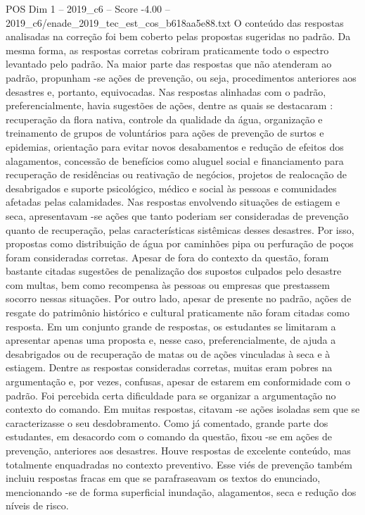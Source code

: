 \begin{textsample}{POS Dim 1 – 2019\_c6 – Score -4.00 – 2019\_c6/enade\_2019\_tec\_est\_cos\_b618aa5e88.txt}
O conteúdo das respostas analisadas na correção foi bem coberto pelas propostas sugeridas no padrão.
Da mesma forma, as respostas corretas cobriram praticamente todo o espectro levantado pelo padrão.
Na maior parte das respostas que não atenderam ao padrão, propunham -se ações de prevenção, ou seja, procedimentos anteriores aos desastres e, portanto, equivocadas.
Nas respostas alinhadas com o padrão, preferencialmente, havia sugestões de ações, dentre as quais se destacaram : recuperação da flora nativa, controle da qualidade da água, organização e treinamento de grupos de voluntários para ações de prevenção de surtos e epidemias, orientação para evitar novos desabamentos e redução de efeitos dos alagamentos, concessão de benefícios como aluguel social e financiamento para recuperação de residências ou reativação de negócios, projetos de realocação de desabrigados e suporte psicológico, médico e social às pessoas e comunidades afetadas pelas calamidades.
Nas respostas envolvendo situações de estiagem e seca, apresentavam -se ações que tanto poderiam ser consideradas de prevenção quanto de recuperação, pelas características sistêmicas desses desastres.
Por isso, propostas como distribuição de água por caminhões pipa ou perfuração de poços foram consideradas corretas.
Apesar de fora do contexto da questão, foram bastante citadas sugestões de penalização dos supostos culpados pelo desastre com multas, bem como recompensa às pessoas ou empresas que prestassem socorro nessas situações.
Por outro lado, apesar de presente no padrão, ações de resgate do patrimônio histórico e cultural praticamente não foram citadas como resposta.
Em um conjunto grande de respostas, os estudantes se limitaram a apresentar apenas uma proposta e, nesse caso, preferencialmente, de ajuda a desabrigados ou de recuperação de matas ou de ações vinculadas à seca e à estiagem.
Dentre as respostas consideradas corretas, muitas eram pobres na argumentação e, por vezes, confusas, apesar de estarem em conformidade com o padrão.
Foi percebida certa dificuldade para se organizar a argumentação no contexto do comando.
Em muitas respostas, citavam -se ações isoladas sem que se caracterizasse o seu desdobramento.
Como já comentado, grande parte dos estudantes, em desacordo com o comando da questão, fixou -se em ações de prevenção, anteriores aos desastres.
Houve respostas de excelente conteúdo, mas totalmente enquadradas no contexto preventivo.
Esse viés de prevenção também incluiu respostas fracas em que se parafraseavam os textos do enunciado, mencionando -se de forma superficial inundação, alagamentos, seca e redução dos níveis de risco.

\end{textsample}
